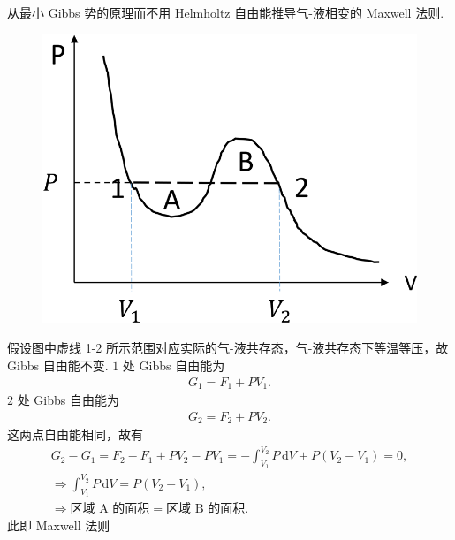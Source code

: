 \documentclass{assignment}
\begin{document}
\begin{prob}
    从最小 Gibbs 势的原理而不用 Helmholtz 自由能推导气-液相变的 Maxwell 法则.
\end{prob}
\begin{pf}
    \begin{figure}[h]
        \centering
        \includegraphics[width=.4\columnwidth]{A2-P4-2.png}
    \end{figure}
    假设图中虚线 1-2 所示范围对应实际的气-液共存态，气-液共存态下等温等压，故 Gibbs 自由能不变. $1$ 处 Gibbs 自由能为
    \begin{align}
        G_1=F_1+PV_1.
    \end{align}
    $2$ 处 Gibbs 自由能为
    \begin{align}
        G_2=F_2+PV_2.
    \end{align}
    这两点自由能相同，故有
    \begin{gather}
        G_2-G_1=F_2-F_1+PV_2-PV_1=-\int_{V_1}^{V_2}P\,\mathrm{d}V+P(V_2-V_1)=0,\\
        \Longrightarrow\int_{V_1}^{V_2}P\,\mathrm{d}V=P(V_2-V_1),\\
        \Longrightarrow\text{区域 A 的面积}=\text{区域 B 的面积}.
    \end{gather}
    此即 Maxwell 法则
\end{pf}
\end{document}
